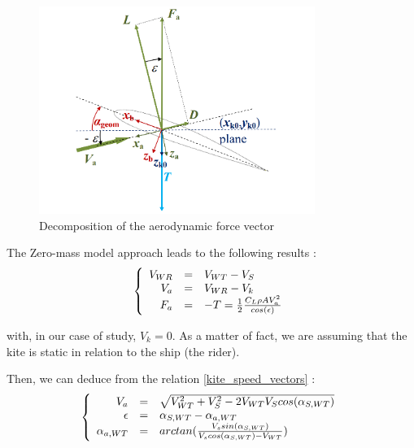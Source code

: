 \begin{figure}[H]
    \centering
    \includegraphics[width=0.8\textwidth]{figures/2D steady simulations/kite flight modeling 2.png}
    \caption{Decomposition of the aerodynamic force vector}
    \label{fig:Kite_flight_modelling}
\end{figure}

The Zero-mass model approach leads to the following results : 
\begin{equation}
\left \{
   \begin{array}{r c l}
      V_{WR}  & = & V_{WT} - V_{S} \\
      V_{a}   & = & V_{WR} - V_{k} \\
      F_{a} & = & -T = \frac{1}{2}\frac{C_{L} \rho A V_{a}^{2}}{cos(\epsilon)}
   \end{array}
   \right .
   \label{kite_speed_vectors}
\end{equation}

with, in our case of study, $V_{k} = 0$. As a matter of fact, we are assuming that the kite is static in relation to the ship (the rider). 


Then, we can deduce from the relation \ref{kite_speed_vectors} : 
\begin{equation}
\left \{
   \begin{array}{r c l}
      V_{a}  & = & \sqrt{V_{WT}^2 + V_{S}^2 - 2V_{WT}V_{S}cos(\alpha_{S, WT}) } \\
      \epsilon   & = & \alpha_{S, WT} - \alpha_{a, WT} \\
      \alpha_{a, WT} & = & arctan(\frac{V_{s}sin(\alpha_{S, WT})}{V_{s}cos(\alpha_{S, WT}) - V_{WT}})
   \end{array}
   \right .
   \label{kite_speed_vectors_2}
\end{equation}


